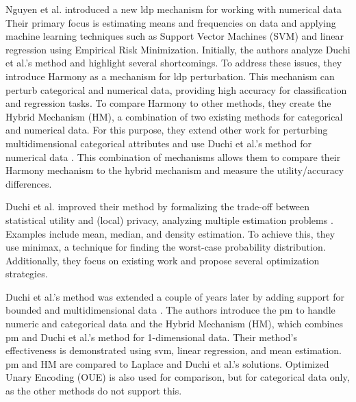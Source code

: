 Nguyen et al. introduced a new \gls{ldp} mechanism for working with numerical data \citep{nguyen_collecting_2016}
Their primary focus is estimating means and frequencies on data and applying machine learning techniques such as Support Vector Machines (SVM) and linear regression using Empirical Risk Minimization.
Initially, the authors analyze Duchi et al.'s method \citep{duchi_privacy_2013} and highlight several shortcomings.
To address these issues, they introduce Harmony as a mechanism for \gls{ldp} perturbation.
This mechanism can perturb categorical and numerical data, providing high accuracy for classification and regression tasks.
To compare Harmony to other methods, they create the Hybrid Mechanism (HM), a combination of two existing methods for categorical and numerical data.
For this purpose, they extend other work \citep{bassily_local_2015} for perturbing multidimensional categorical attributes and use Duchi et al.'s method for numerical data \citep{duchi_privacy_2013}.
This combination of mechanisms allows them to compare their Harmony mechanism to the hybrid mechanism and measure the utility/accuracy differences.

Duchi et al. improved their method by formalizing the trade-off between statistical utility and (local) privacy, analyzing multiple estimation problems \citep{duchi_minimax_2017}.
Examples include mean, median, and density estimation.
To achieve this, they use minimax, a technique for finding the worst-case probability distribution.
Additionally, they focus on existing work and propose several optimization strategies.

Duchi et al.'s method was extended a couple of years later by adding support for bounded and multidimensional data \citep{wang_collecting_2019}.
The authors introduce the \gls{pm} to handle numeric and categorical data and the Hybrid Mechanism (HM), which combines \gls{pm} and Duchi et al.'s method for 1-dimensional data.
Their method's effectiveness is demonstrated using \gls{svm}, linear regression, and mean estimation.
\gls{pm} and HM are compared to Laplace and Duchi et al.'s solutions.
Optimized Unary Encoding (OUE) \citep{wang_locally_nodate} is also used for comparison, but for categorical data only, as the other methods do not support this.


